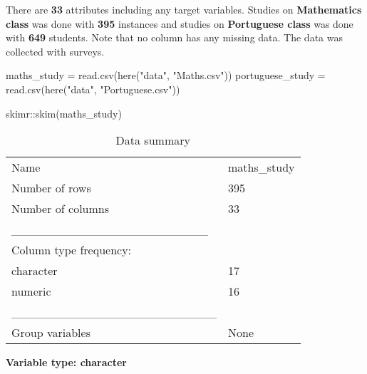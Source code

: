 \documentclass[
]{article}
\newenvironment{Shaded}{\begin{snugshade}}{\end{snugshade}}
\newcommand{\FunctionTok}[1]{\textcolor[rgb]{0.00,0.00,0.00}{#1}}
\newcommand{\NormalTok}[1]{#1}
\newcommand{\OtherTok}[1]{\textcolor[rgb]{0.56,0.35,0.01}{#1}}
\newcommand{\SpecialCharTok}[1]{\textcolor[rgb]{0.00,0.00,0.00}{#1}}
\newcommand{\StringTok}[1]{\textcolor[rgb]{0.31,0.60,0.02}{#1}}
\begin{document}
There are \textbf{33} attributes including any target variables. Studies
on \textbf{Mathematics class} was done with \textbf{395} instances and
studies on \textbf{Portuguese class} was done with \textbf{649}
students. Note that no column has any missing data. The data was
collected with surveys.

\begin{Shaded}
\begin{Highlighting}[]
\NormalTok{maths\_study }\OtherTok{=} \FunctionTok{read.csv}\NormalTok{(}\FunctionTok{here}\NormalTok{(}\StringTok{"data"}\NormalTok{, }\StringTok{"Maths.csv"}\NormalTok{))}
\NormalTok{portuguese\_study }\OtherTok{=} \FunctionTok{read.csv}\NormalTok{(}\FunctionTok{here}\NormalTok{(}\StringTok{"data"}\NormalTok{, }\StringTok{"Portuguese.csv"}\NormalTok{))}
\end{Highlighting}
\end{Shaded}

\begin{Shaded}
\begin{Highlighting}[]
\NormalTok{skimr}\SpecialCharTok{::}\FunctionTok{skim}\NormalTok{(maths\_study)}
\end{Highlighting}
\end{Shaded}

\begin{longtable}[]{@{}ll@{}}
\caption{Data summary}\tabularnewline
\toprule()
\endhead
Name & maths\_study \\
Number of rows & 395 \\
Number of columns & 33 \\
\_\_\_\_\_\_\_\_\_\_\_\_\_\_\_\_\_\_\_\_\_\_\_ & \\
Column type frequency: & \\
character & 17 \\
numeric & 16 \\
\_\_\_\_\_\_\_\_\_\_\_\_\_\_\_\_\_\_\_\_\_\_\_\_ & \\
Group variables & None \\
\bottomrule()
\end{longtable}

\textbf{Variable type: character}
\end{document}
